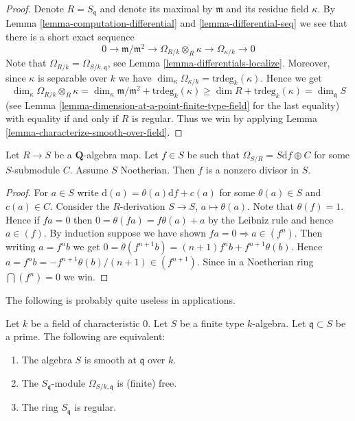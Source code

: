 \begin{proof}
Denote $R = S_{\mathfrak q}$ and denote its maximal
by $\mathfrak m$ and its residue field $\kappa$.
By Lemma \ref{lemma-computation-differential} and
\ref{lemma-differential-seq} we see that there is a short exact
sequence
$$
0 \to \mathfrak m/\mathfrak m^2 \to
\Omega_{R/k} \otimes_R \kappa \to
\Omega_{\kappa/k} \to 0
$$
Note that $\Omega_{R/k} = \Omega_{S/k, \mathfrak q}$, see
Lemma \ref{lemma-differentials-localize}.
Moreover, since $\kappa$ is separable over $k$
we have $\dim_{\kappa} \Omega_{\kappa/k} = \text{trdeg}_k(\kappa)$.
Hence we get
$$
\dim_{\kappa} \Omega_{R/k} \otimes_R \kappa
=
\dim_\kappa \mathfrak m/\mathfrak m^2 + \text{trdeg}_k (\kappa)
\geq
\dim R + \text{trdeg}_k (\kappa)
=
\dim_{\mathfrak q} S
$$
(see Lemma \ref{lemma-dimension-at-a-point-finite-type-field} for
the last equality)
with equality if and only if $R$ is regular.
Thus we win by applying Lemma \ref{lemma-characterize-smooth-over-field}.
\end{proof}

\begin{lemma}
\label{lemma-characteristic-zero}
Let $R \to S$ be a $\mathbf{Q}$-algebra map.
Let $f \in S$ be such that $\Omega_{S/R} = S \text{d}f \oplus C$
for some $S$-submodule $C$. Assume $S$ Noetherian.
Then $f$ is a nonzero divisor in $S$.
\end{lemma}

\begin{proof}
For $a \in S$ write $\text{d}(a) = \theta(a)\text{d}f + c(a)$ for some
$\theta(a) \in S$ and $c(a) \in C$.
Consider the $R$-derivation $S \to S$, $a \mapsto \theta(a)$.
Note that $\theta(f) = 1$. Hence if $fa = 0$ then
$0 = \theta(fa) = f\theta(a) + a$ by the Leibniz rule and hence $a \in (f)$.
By induction suppose we have shown $fa = 0 \Rightarrow a \in (f^n)$.
Then writing $a = f^nb$ we get
$0 = \theta(f^{n + 1}b) = (n + 1)f^nb + f^{n + 1}\theta(b)$.
Hence $a = f^n b = -f^{n + 1}\theta(b)/(n + 1) \in (f^{n + 1})$.
Since in a Noetherian ring $\bigcap (f^n) = 0$ we win.
\end{proof}

\noindent
The following is probably quite useless in applications.

\begin{lemma}
\label{lemma-characteristic-zero-local-smooth}
Let $k$ be a field of characteristic $0$.
Let $S$ be a finite type $k$-algebra.
Let $\mathfrak q \subset S$ be a prime.
The following are equivalent:
\begin{enumerate}
\item The algebra $S$ is smooth at $\mathfrak q$ over $k$.
\item The $S_{\mathfrak q}$-module $\Omega_{S/k, \mathfrak q}$
is (finite) free.
\item The ring $S_{\mathfrak q}$ is regular.
\end{enumerate}
\end{lemma}

